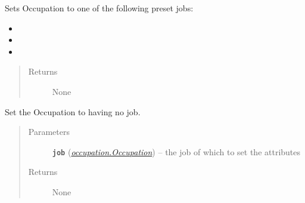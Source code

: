 \documentclass[letterpaper,10pt,english]{sphinxmanual}
\begin{document}
\begin{fulllineitems}
\begin{fulllineitems}
\begin{quote}
\begin{description}
\end{description}\end{quote}

\end{fulllineitems}


\begin{fulllineitems}
\label{occupation:occupation.Occupation.set_job_preset}
Sets Occupation to one of the following preset jobs:
\begin{itemize}
\item {} 

\item {} 

\item {} 

\end{itemize}
\begin{quote}\begin{description}
\item[{Returns}] \leavevmode
None

\end{description}\end{quote}

\end{fulllineitems}


\begin{fulllineitems}
\label{occupation:occupation.Occupation.set_no_job}
Set the Occupation to having no job.
\begin{quote}\begin{description}
\item[{Parameters}] \leavevmode
\textbf{\texttt{job}} ({\hyperref[occupation:occupation.Occupation]{\emph{\emph{occupation.Occupation}}}}) -- the job of which to set the attributes

\item[{Returns}] \leavevmode
None

\end{description}\end{quote}

\end{fulllineitems}



\end{fulllineitems}
\end{document}
